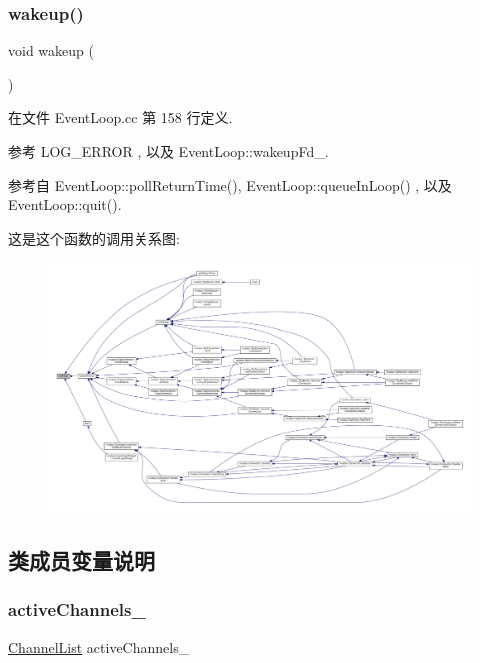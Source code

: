 \subsubsection{\texorpdfstring{wakeup()}{wakeup()}}
{\footnotesize\ttfamily void wakeup (\begin{DoxyParamCaption}{ }\end{DoxyParamCaption})}



在文件 Event\+Loop.\+cc 第 158 行定义.



参考 L\+O\+G\+\_\+\+E\+R\+R\+OR , 以及 Event\+Loop\+::wakeup\+Fd\+\_\+.



参考自 Event\+Loop\+::poll\+Return\+Time(), Event\+Loop\+::queue\+In\+Loop() , 以及 Event\+Loop\+::quit().

这是这个函数的调用关系图\+:
\nopagebreak
\begin{figure}[H]
\begin{center}
\leavevmode
\includegraphics[width=350pt]{classmuduo_1_1EventLoop_ae674290a26ecbd622c5160e38e8a4fe9_icgraph}
\end{center}
\end{figure}


\subsection{类成员变量说明}
\mbox{\label{classmuduo_1_1EventLoop_a9196549e63e60c1a0749ca09d7df6155}} 
\subsubsection{\texorpdfstring{active\+Channels\+\_\+}{activeChannels\_}}
{\footnotesize\ttfamily \hyperlink{classmuduo_1_1EventLoop_a0b74248ffee6df294563618187b52404}{Channel\+List} active\+Channels\+\_\+\hspace{0.3cm}{\ttfamily [private]}}



